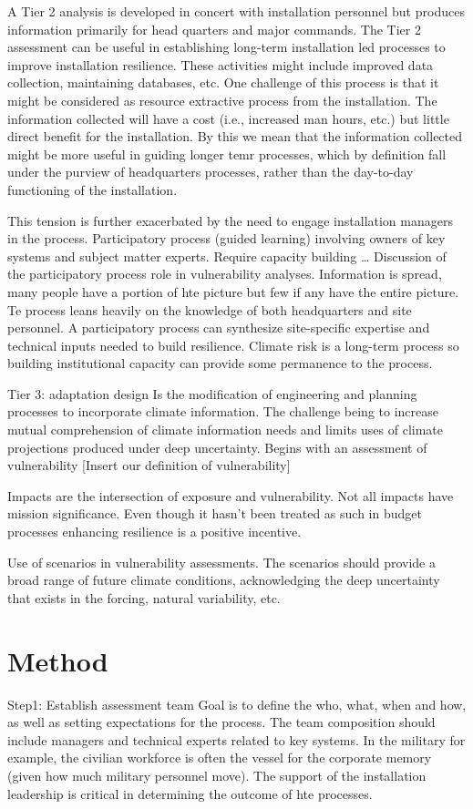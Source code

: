 \documentclass[10pt]{amsart}
\begin{document}
A Tier 2 analysis is developed in concert with installation personnel but produces information primarily for head quarters and major commands.
The Tier 2 assessment can be useful in establishing long-term installation led processes to improve installation resilience.
These activities might include improved data collection, maintaining databases, etc.
One challenge of this process is that it might be considered as resource extractive process from the installation.
The information collected will have a cost (i.e., increased man hours, etc.) but little direct benefit for the installation.
By this we mean that the information collected might be more useful in guiding longer temr processes, which by definition fall under the purview of headquarters processes, rather than the day-to-day functioning of the installation. 

This tension is further exacerbated by the need to engage installation managers in the process.
Participatory process (guided learning) involving owners of key systems and subject matter experts.
Require capacity building \ldots
Discussion of the participatory process role in vulnerability analyses.
Information is spread, many people have a portion of hte picture but few if any have the entire picture.
Te process leans heavily on the knowledge of both headquarters and site personnel. 
A participatory process can synthesize site-specific expertise and technical inputs needed to build resilience. 
Climate risk is a long-term process so building institutional capacity can provide some permanence to the process.

Tier 3: adaptation design
Is the modification of engineering and planning processes to incorporate climate information.
The challenge being to increase mutual comprehension of climate information needs and limits uses of climate projections produced under 
deep uncertainty.
Begins with an assessment of vulnerability 
[Insert our definition of vulnerability]

Impacts are the intersection of exposure and vulnerability.
Not all impacts have mission significance. 
Even though it hasn't been treated as such in budget processes enhancing resilience is a positive incentive.

Use of scenarios in vulnerability assessments.
The scenarios should provide a broad range of future climate conditions, acknowledging the deep uncertainty that exists in the forcing, natural variability, etc. 

\section{Method}
Step1: Establish assessment team
Goal is to define the who, what, when and how, as well as setting expectations for the process.
The team composition should include managers and technical experts related to key systems.
In the military for example, the civilian workforce is often the vessel for the corporate memory (given how much military personnel move).
The support of the installation leadership is critical in determining the outcome of hte processes. 
\end{document}
